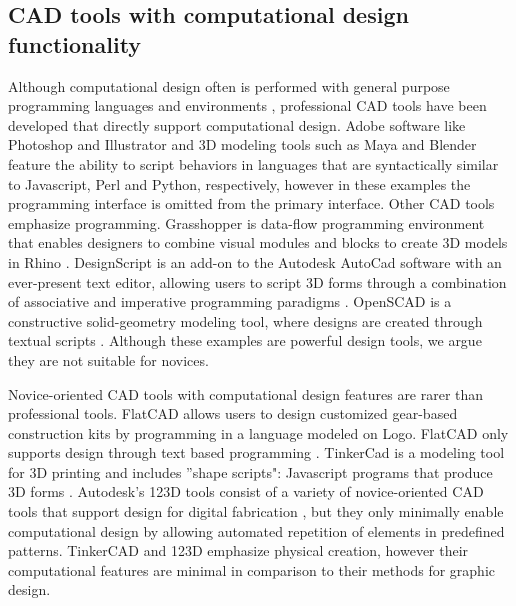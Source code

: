 \documentclass{sigchi}
\begin{document}
\subsection{CAD tools with computational design functionality} 
Although computational design often is performed with general purpose programming languages and environments \cite{reas}, professional CAD tools have been developed that directly support computational design. Adobe software like Photoshop and Illustrator and 3D modeling tools such as Maya and Blender feature the ability to script behaviors in languages that are syntactically similar to Javascript, Perl and Python, respectively, however in these examples the programming interface is omitted from the primary interface. Other CAD tools emphasize programming. Grasshopper is data-flow programming environment that enables designers to combine visual modules and blocks to create 3D models in Rhino \cite{grasshopper}. DesignScript is an add-on to the Autodesk AutoCad software with an ever-present text editor, allowing users to script 3D forms through a combination of associative and imperative programming paradigms \cite{DesignScript}. OpenSCAD is a constructive solid-geometry modeling tool, where designs are created through textual scripts \cite{openScad}. Although these examples are powerful design tools, we argue they are not suitable for novices.

Novice-oriented CAD tools with computational design features are rarer than professional tools. FlatCAD allows users to design customized gear-based construction kits by programming in a language modeled on Logo. FlatCAD only supports design through text based programming \cite{flatcad}. TinkerCad is a modeling tool for 3D printing and includes ''shape scripts": Javascript programs that produce 3D forms \cite{tinkercad}. Autodesk's 123D tools consist of a variety of novice-oriented CAD tools that support design for digital fabrication \cite{123D}, but they only minimally enable computational design by allowing automated repetition of elements in predefined patterns. TinkerCAD and 123D emphasize physical creation, however their computational features are minimal in comparison to their methods for graphic design.
\end{document}
